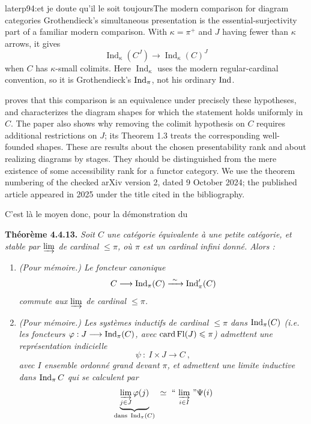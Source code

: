 \begin{dcomment}{later}{p94:et je doute qu'il le soit toujours}{The modern comparison for diagram categories}
Grothendieck's simultaneous presentation is the essential-surjectivity part of a familiar modern comparison. With $\kappa=\pi^+$ and $J$ having fewer than $\kappa$ arrows, it gives
\[
\operatorname{Ind}_{\kappa}(C^J)
\longrightarrow
\operatorname{Ind}_{\kappa}(C)^J
\]
when $C$ has $\kappa$-small colimits. Here $\operatorname{Ind}_{\kappa}$ uses the modern regular-cardinal convention, so it is Grothendieck's $\operatorname{Ind}_\pi$, not his ordinary $\operatorname{Ind}$.

\citet[Theorem 1.2 and Corollary 2.2]{Henry2025} proves that this comparison is an equivalence under precisely these hypotheses, and characterizes the diagram shapes for which the statement holds uniformly in $C$. The paper also shows why removing the colimit hypothesis on $C$ requires additional restrictions on $J$; its Theorem 1.3 treats the corresponding well-founded shapes. These are results about the chosen presentability rank and about realizing diagrams by stages. They should be distinguished from the mere existence of some accessibility rank for a functor category. We use the theorem numbering of the checked arXiv version 2, dated 9 October 2024; the published article appeared in 2025 under the title cited in the bibliography.
\end{dcomment}


C'est là le moyen donc, pour la démonstration du

\textbf{Théorème 4.4.13.} \textit{Soit $C$ une catégorie équivalente à une petite catégorie, et stable par $\varinjlim$ de cardinal $\leqslant \pi$, où $\pi$ est un cardinal infini donné. Alors :}

\begin{enumerate}[label={}, leftmargin=*]
\item[\textit{a)}] \textit{(Pour mémoire.) Le foncteur canonique}
\[
C \longrightarrow \Ind_\pi(C) \xrightarrow{\ \sim\ } \Ind'_\pi(C)
\]
\textit{commute aux $\varinjlim$ de cardinal $\leqslant \pi$.}
\item[\textit{b)}] \textit{(Pour mémoire.) Les systèmes inductifs de cardinal $\leqslant \pi$ dans $\operatorname{Ind}_\pi(C)$ (i.e. les foncteurs $\varphi : J \longrightarrow \operatorname{Ind}_\pi(C)$, avec $\operatorname{card} \operatorname{Fl}(J) \leqslant \pi$) admettent une représentation indicielle}
\[
\psi \ :\ I \times J \longrightarrow C\ ,
\]
\textit{avec $I$ ensemble ordonné grand devant $\pi$, et admettent une limite inductive dans $\operatorname{Ind}_\pi C$ qui se calculent par}
\[
\underbrace{\varinjlim_{j\in J} \varphi(j)}_{\text{dans } \Ind_\pi(C)} \ \simeq\ \text{“}\,\varinjlim_{i\in I}\,\text{”}\Psi(i)
\]
\end{enumerate}

